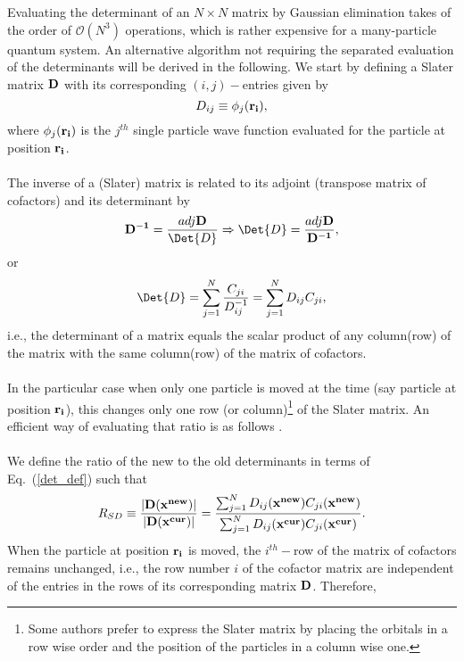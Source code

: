 Evaluating the determinant of an $N \times N$ matrix by Gaussian elimination takes of the order of $\mathcal{O}(N^3)$ operations, which is rather expensive for a many-particle quantum system. An alternative algorithm not 
requiring the separated evaluation of the determinants will be derived in the following. We start by defining a Slater matrix ${\bf D} $ with its corresponding $(i,j)-$entries given by 
\begin{equation}\label{indexform_SM}
 D_{ij} \equiv \phi_j({\bf r_i}),
\end{equation}
where $\phi_j({\bf r_i})$ is the $j^{th}$ single particle wave function evaluated for the particle at position ${\bf r_i}$.\\
\\
\noindent
The inverse of a (Slater) matrix is related to its adjoint (transpose matrix of cofactors) and its determinant by
\begin{equation}\label{inverseDef}
{\bf D^{-1}} = \frac{adj{{\bf D}}}{\Det{D}} \Rightarrow \Det{D} = \frac{adj{{\bf D}}}{{\bf D^{-1}}}, 
\end{equation}
or
\begin{equation}\label{det_def}
 \Det{D} = \sum_{j=1}^{N}\frac{C_{ji}}{D^{-1}_{ij}} = \sum_{j=1}^{N}D_{ij} C_{ji},
\end{equation}
i.e., the determinant of a matrix equals the scalar product of any column(row) of the matrix with the same column(row) of the matrix of cofactors.\\
\\
\noindent
In the particular case when only one particle is moved at the time (say particle at position ${\bf r_i}$), this changes only one row (or column)\footnote{Some authors prefer to express the Slater matrix by placing the orbitals in a row wise order and the position of the particles in a column wise one.} of the Slater matrix. An efficient way of evaluating that ratio is as follows \cite{ceperley1977,abinitio}.\\
\\
\noindent
We define the ratio of the new to the old determinants in terms of Eq.~(\ref{det_def}) such that
$$R_{SD} \equiv \frac{|{\bf D}({\bf x^{new}})|}{|{\bf D}({\bf x^{cur}})|} = \frac{\sum_{j=1}^{N}D_{ij}({\bf x^{new}}) C_{ji}({\bf x^{new}})}{\sum_{j=1}^{N}D_{ij}({\bf x^{cur}}) C_{ji}({\bf x^{cur}})}.
$$
When the particle at position ${\bf r_i}$ is moved, the $i^{th}-$row of the matrix of cofactors remains unchanged, i.e., the row number $i$ of the cofactor matrix are independent of the entries in the rows of its corresponding matrix ${\bf D}$. Therefore, 
